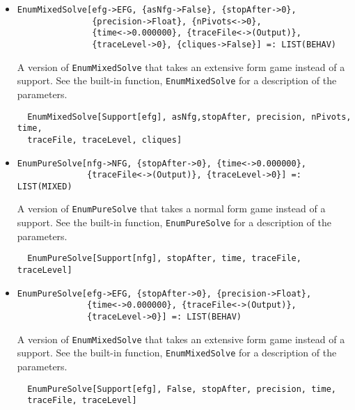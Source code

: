 \begin{itemize}
\item{}
\protect \large \begin{verbatim}
EnumMixedSolve[efg->EFG, {asNfg->False}, {stopAfter->0}, 
               {precision->Float}, {nPivots<->0}, 
               {time<->0.000000}, {traceFile<->(Output)}, 
               {traceLevel->0}, {cliques->False}] =: LIST(BEHAV) 
\end{verbatim}\normalsize

\bd 
A version of \verb+EnumMixedSolve+ that takes an extensive form game instead
of a support.  See the built-in function, \verb+EnumMixedSolve+ for a
description of the parameters.
\begin{verbatim}
  EnumMixedSolve[Support[efg], asNfg,stopAfter, precision, nPivots, time,
  traceFile, traceLevel, cliques]
\end{verbatim} 
\ed

\item{}
\protect \large \begin{verbatim}
EnumPureSolve[nfg->NFG, {stopAfter->0}, {time<->0.000000}, 
              {traceFile<->(Output)}, {traceLevel->0}] =: LIST(MIXED) 
\end{verbatim}\normalsize

\bd 
A version of \verb+EnumPureSolve+ that takes a normal form game instead
of a support.  See the built-in function, \verb+EnumPureSolve+ for a
description of the parameters.
\begin{verbatim}
  EnumPureSolve[Support[nfg], stopAfter, time, traceFile, traceLevel]
\end{verbatim} 
\ed

\item{}
\protect \large \begin{verbatim}
EnumPureSolve[efg->EFG, {stopAfter->0}, {precision->Float}, 
              {time<->0.000000}, {traceFile<->(Output)}, 
              {traceLevel->0}] =: LIST(BEHAV) 
\end{verbatim}\normalsize

\bd 
A version of \verb+EnumMixedSolve+ that takes an extensive form
game instead of a support.  See the built-in function,
\verb+EnumMixedSolve+ for a description of the parameters.
\begin{verbatim}
  EnumPureSolve[Support[efg], False, stopAfter, precision, time, 
  traceFile, traceLevel]
\end{verbatim} 
\ed



\end{itemize}
